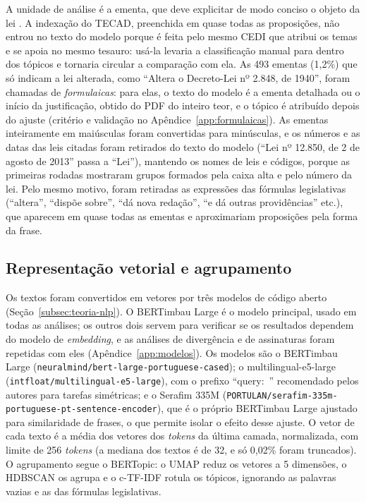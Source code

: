\documentclass[12pt]{article}
\begin{document}
A unidade de análise é a ementa, que deve explicitar de modo conciso o objeto da lei \citep{brasil1998lc95}. A indexação do TECAD, preenchida em quase todas as proposições, não entrou no texto do modelo porque é feita pelo mesmo CEDI que atribui os temas e se apoia no mesmo tesauro: usá-la levaria a classificação manual para dentro dos tópicos e tornaria circular a comparação com ela. As 493 ementas (1,2\%) que só indicam a lei alterada, como ``Altera o Decreto-Lei nº 2.848, de 1940'', foram chamadas de \textit{formulaicas}: para elas, o texto do modelo é a ementa detalhada ou o início da justificação, obtido do PDF do inteiro teor, e o tópico é atribuído depois do ajuste (critério e validação no Apêndice~\ref{app:formulaicas}). As ementas inteiramente em maiúsculas foram convertidas para minúsculas, e os números e as datas das leis citadas foram retirados do texto do modelo (``Lei nº 12.850, de 2 de agosto de 2013'' passa a ``Lei''), mantendo os nomes de leis e códigos, porque as primeiras rodadas mostraram grupos formados pela caixa alta e pelo número da lei. Pelo mesmo motivo, foram retiradas as expressões das fórmulas legislativas (``altera'', ``dispõe sobre'', ``dá nova redação'', ``e dá outras providências'' etc.), que aparecem em quase todas as ementas e aproximariam proposições pela forma da frase.

\subsection{Representação vetorial e agrupamento}
\label{subsec:agrupamento}

Os textos foram convertidos em vetores por três modelos de código aberto (Seção~\ref{subsec:teoria-nlp}). O BERTimbau Large é o modelo principal, usado em todas as análises; os outros dois servem para verificar se os resultados dependem do modelo de \textit{embedding}, e as análises de divergência e de assinaturas foram repetidas com eles (Apêndice~\ref{app:modelos}). Os modelos são o BERTimbau Large (\texttt{neuralmind/bert-large-portuguese-cased}); o multilingual-e5-large (\texttt{intfloat/multilingual-e5-large}), com o prefixo ``query:~'' recomendado pelos autores para tarefas simétricas; e o Serafim 335M (\texttt{PORTULAN/serafim-335m-portuguese-pt-sentence-encoder}), que é o próprio BERTimbau Large ajustado para similaridade de frases, o que permite isolar o efeito desse ajuste. O vetor de cada texto é a média dos vetores dos \textit{tokens} da última camada, normalizada, com limite de 256 \textit{tokens} (a mediana dos textos é de 32, e só 0,02\% foram truncados). O agrupamento segue o BERTopic: o UMAP reduz os vetores a 5 dimensões, o HDBSCAN os agrupa e o c-TF-IDF rotula os tópicos, ignorando as palavras vazias e as das fórmulas legislativas.
\end{document}
